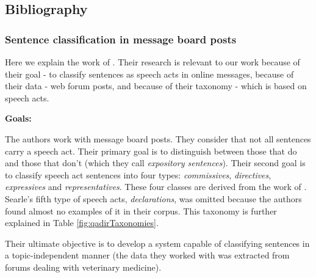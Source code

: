 \documentclass[11pt]{article}
\begin{document}

\subsection{Bibliography}


\subsubsection{Sentence classification in message board posts}

Here we explain the work of \cite{qadir2011classifying}. Their research is relevant to our work because of their goal - to classify sentences as speech acts in online messages, because of their data - web forum posts, and because of their taxonomy - which is based on speech acts.

\vspace{0.5cm}
\textbf{Goals:}
\vspace{0.1cm}

The authors work with message board posts. They consider that not all sentences carry a speech act. Their primary goal is to distinguish between those that do and those that don't (which they call \textit{expository sentences}). Their second goal is to classify speech act sentences into four types: \textit{commissives}, \textit{directives}, \textit{expressives} and \textit{representatives}. These four classes are derived from the work of \cite{searle1976taxonomy}. Searle's fifth type of speech acts, \textit{declarations}, was omitted because the authors found almost no examples of it in their corpus.  This taxonomy is further explained in Table \ref{fig:qadirTaxonomies}.

Their ultimate objective is to develop a system capable of classifying sentences in a topic-independent manner (the data they worked with was extracted from forums dealing with veterinary medicine).
\end{document}
